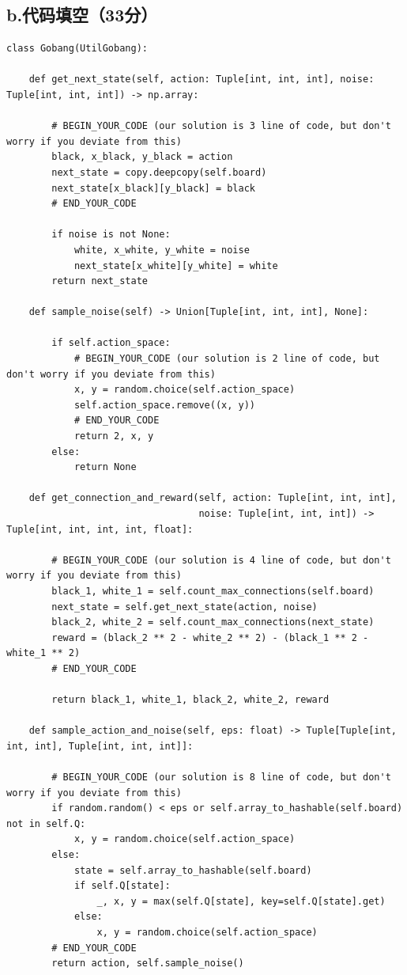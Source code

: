 \documentclass{article}
\begin{document}
\subsection*{b.代码填空（33分）}
\begin{lstlisting}
class Gobang(UtilGobang):
    
    def get_next_state(self, action: Tuple[int, int, int], noise: Tuple[int, int, int]) -> np.array:

        # BEGIN_YOUR_CODE (our solution is 3 line of code, but don't worry if you deviate from this)
        black, x_black, y_black = action
        next_state = copy.deepcopy(self.board)
        next_state[x_black][y_black] = black
        # END_YOUR_CODE

        if noise is not None:
            white, x_white, y_white = noise
            next_state[x_white][y_white] = white
        return next_state

    def sample_noise(self) -> Union[Tuple[int, int, int], None]:

        if self.action_space:
            # BEGIN_YOUR_CODE (our solution is 2 line of code, but don't worry if you deviate from this)
            x, y = random.choice(self.action_space)
            self.action_space.remove((x, y))
            # END_YOUR_CODE
            return 2, x, y
        else:
            return None

    def get_connection_and_reward(self, action: Tuple[int, int, int],
                                  noise: Tuple[int, int, int]) -> Tuple[int, int, int, int, float]:

        # BEGIN_YOUR_CODE (our solution is 4 line of code, but don't worry if you deviate from this)
        black_1, white_1 = self.count_max_connections(self.board)
        next_state = self.get_next_state(action, noise)
        black_2, white_2 = self.count_max_connections(next_state)
        reward = (black_2 ** 2 - white_2 ** 2) - (black_1 ** 2 - white_1 ** 2)
        # END_YOUR_CODE

        return black_1, white_1, black_2, white_2, reward

    def sample_action_and_noise(self, eps: float) -> Tuple[Tuple[int, int, int], Tuple[int, int, int]]:

        # BEGIN_YOUR_CODE (our solution is 8 line of code, but don't worry if you deviate from this)
        if random.random() < eps or self.array_to_hashable(self.board) not in self.Q:
            x, y = random.choice(self.action_space)
        else:
            state = self.array_to_hashable(self.board)
            if self.Q[state]:
                _, x, y = max(self.Q[state], key=self.Q[state].get)
            else:
                x, y = random.choice(self.action_space)
        # END_YOUR_CODE
        return action, self.sample_noise()


\end{lstlisting}
\end{document}
